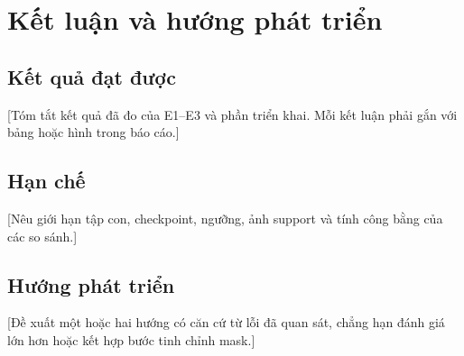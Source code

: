 \chapter{Kết luận và hướng phát triển}
\section{Kết quả đạt được}
[Tóm tắt kết quả đã đo của E1--E3 và phần triển khai. Mỗi kết luận phải gắn với bảng hoặc hình trong báo cáo.]

\section{Hạn chế}
[Nêu giới hạn tập con, checkpoint, ngưỡng, ảnh support và tính công bằng của các so sánh.]

\section{Hướng phát triển}
[Đề xuất một hoặc hai hướng có căn cứ từ lỗi đã quan sát, chẳng hạn đánh giá lớn hơn hoặc kết hợp bước tinh chỉnh mask.]
